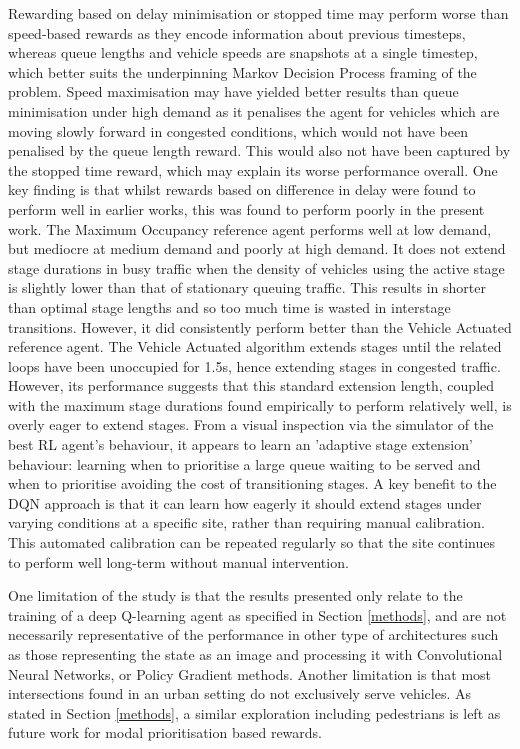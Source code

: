 \documentclass{article}
\begin{document}
Rewarding based on delay minimisation or stopped time may perform worse than speed-based rewards as they encode information about previous timesteps, whereas queue lengths and vehicle speeds are snapshots at a single timestep, which better suits the underpinning Markov Decision Process framing of the problem.
Speed maximisation may have yielded better results than queue minimisation under high demand as it penalises the agent for vehicles which are moving slowly forward in congested conditions, which would not have been penalised by the queue length reward.
This would also not have been captured by the stopped time reward, which may explain its worse performance overall. One key finding is that whilst rewards based on difference in delay were found to perform well in earlier works, this was found to perform poorly in the present work.
The Maximum Occupancy reference agent performs well at low demand, but mediocre at medium demand and poorly at high demand.
It does not extend stage durations in busy traffic when the density of vehicles using the active stage is slightly lower than that of stationary queuing traffic.
This results in shorter than optimal stage lengths and so too much time is wasted in interstage transitions.
However, it did consistently perform better than the Vehicle Actuated reference agent.
The Vehicle Actuated algorithm extends stages until the related loops have been unoccupied for 1.5s, hence extending stages in congested traffic.
However, its performance suggests that this standard extension length, coupled with the maximum stage durations found empirically to perform relatively well, is overly eager to extend stages.
From a visual inspection via the simulator of the best RL agent's behaviour, it appears to learn an 'adaptive stage extension' behaviour: learning when to prioritise a large queue waiting to be served and when to prioritise avoiding the cost of transitioning stages.
A key benefit to the DQN approach is that it can learn how eagerly it should extend stages under varying conditions at a specific site, rather than requiring manual calibration.
This automated calibration can be repeated regularly so that the site continues to perform well long-term without manual intervention.

One limitation of the study is that the results presented only relate to the training of a deep Q-learning agent as specified in Section \ref{methods}, and are not necessarily representative of the performance in other type of architectures such as those representing the state as an image and processing it with Convolutional Neural Networks, or Policy Gradient methods.
Another limitation is that most intersections found in an urban setting do not exclusively serve vehicles. As stated in Section \ref{methods}, a similar exploration including pedestrians is left as future work for modal prioritisation based rewards.
\end{document}
